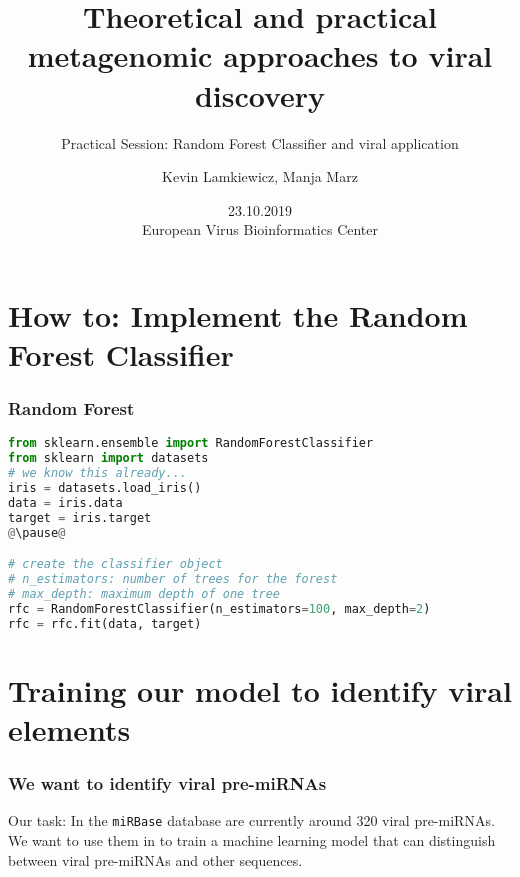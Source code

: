 

\title{Theoretical and practical metagenomic approaches to viral discovery}
\subtitle{Practical Session: Random Forest Classifier and viral application}
\author{Kevin Lamkiewicz, Manja Marz}
\date{23.10.2019\\[1em]European Virus Bioinformatics Center}



\begin{frame}
  \maketitle
\end{frame}

\section[Implementation]{How to: Implement the Random Forest Classifier}

\begin{frame}[c,fragile]\frametitle{Random Forest}
  \begin{lstlisting}[language=Python]
from sklearn.ensemble import RandomForestClassifier
from sklearn import datasets
# we know this already...
iris = datasets.load_iris()
data = iris.data
target = iris.target
@\pause@

# create the classifier object
# n_estimators: number of trees for the forest
# max_depth: maximum depth of one tree
rfc = RandomForestClassifier(n_estimators=100, max_depth=2)
rfc = rfc.fit(data, target)
  \end{lstlisting}
\end{frame}


\section[Hands-On]{Training our model to identify viral elements}

\begin{frame}[c]\frametitle{We want to identify viral pre-miRNAs}
  \begin{block}{Our task:}
    In the \texttt{miRBase} database are currently around 320 viral pre-miRNAs.
    We want to use them in to train a machine learning model that can distinguish between
    viral pre-miRNAs and other sequences.
  \end{block}
  \vspace*{3em}
\end{frame}

